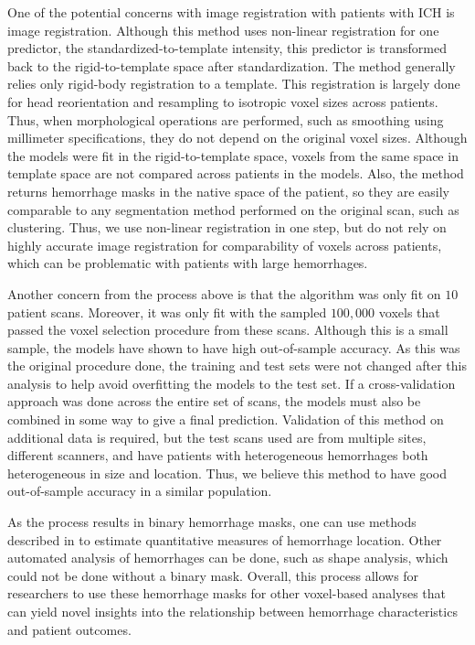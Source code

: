 One of the potential concerns with image registration with patients with ICH is image registration.  Although this method uses non-linear registration for one predictor, the standardized-to-template intensity, this predictor is transformed back to the rigid-to-template space after standardization.  The method generally relies only rigid-body registration to a template.  This registration is largely done for head reorientation and resampling to isotropic voxel sizes across patients.  Thus, when morphological operations  are performed, such as smoothing using millimeter specifications, they do not depend on the original voxel sizes.  Although the models were fit in the rigid-to-template space, voxels from the same space in template space are not compared across patients in the models.  Also, the method returns hemorrhage masks in the native space of the patient, so they are easily comparable to any segmentation method performed on the original scan, such as clustering.  Thus, we use non-linear registration in one step, but do not rely on highly accurate image registration for comparability of voxels across patients, which can be problematic with patients with large hemorrhages.


Another concern from the process above is that the algorithm was only fit on $10$ patient scans.  Moreover, it was only fit with the sampled $100{,}000$ voxels that passed the voxel selection procedure from these scans.  Although this is a small sample, the models have shown to have high out-of-sample accuracy.  As this was the original procedure done, the training and test sets were not changed after this analysis to help avoid overfitting the models to the test set.  If a cross-validation approach was done across the entire set of scans,  the models must also be combined in some way to give a final prediction.  Validation of this method on additional data is required, but the test scans used are from multiple sites, different scanners, and have patients with heterogeneous hemorrhages both heterogeneous in size and location.  Thus, we believe this method to have good out-of-sample accuracy in a similar population.

As the process results in binary hemorrhage masks, one can use methods described in \citet{muschelli2015quantitative} to estimate quantitative measures of hemorrhage location.  Other automated analysis of hemorrhages can be done, such as shape analysis, which could not be done without a binary mask.  Overall, this process allows for researchers to use these hemorrhage masks for other voxel-based analyses that can yield novel insights into the relationship between hemorrhage characteristics and patient outcomes.

